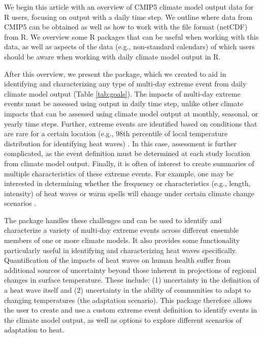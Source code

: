 We begin this article with an overview of CMIP5 climate model output
data for R users, focusing on output with a daily time step. We outline
where data from CMIP5 can be obtained as well as how to work with the
file format (netCDF) from R. We overview some R packages that can be
useful when working with this data, as well as aspects of the data
(e.g., non-standard calendars) of which users should be aware when
working with daily climate model output in R.

After this overview, we present the  package, which
we created to aid in identifying and characterizing any type of
multi-day extreme event from daily climate model output (Table
\ref{tab:goals}). The impacts of multi-day extreme events must be
assessed using output in daily time step, unlike other climate impacts
that can be assessed using climate model output at monthly, seasonal, or
yearly time steps. Further, extreme events are identified based on
conditions that are rare for a certain location (e.g., 98th percentile
of local temperature distribution for identifying heat waves)
\citep{IPCCch1}. In this case, assessment is further complicated, as the
event definition must be determined at each study location from climate
model output. Finally, it is often of interest to create summaries of
multiple characteristics of these extreme events. For example, one may
be interested in determining whether the frequency or characteristics
(e.g., length, intensity) of heat waves or warm spells will change under
certain climate change scenarios \citep{IPCCch1}.

The  package handles these challenges and can be
used to identify and characterize a variety of multi-day extreme events
across different ensemble members of one or more climate models. It also
provides some functionality particularly useful in identifying and
characterizing heat waves specifically. Quantification of the impacts of
heat waves on human health suffer from additional sources of uncertainty
beyond those inherent in projections of regional changes in surface
temperature. These include: (1) uncertainty in the definition of a heat
wave itself and (2) uncertainty in the ability of communities to adapt
to changing temperatures (the adaptation scenario). This package
therefore allows the user to create and use a custom extreme event
definition to identify events in the climate model output, as well as
options to explore different scenarios of adaptation to heat.

